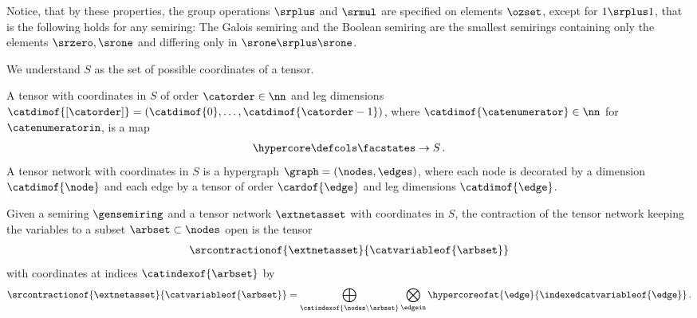 Notice, that by these properties, the group operations $\srplus$ and $\srmul$ are specified on elements $\ozset$, except for $1\srplus 1$, that is the following holds for any semiring:
The Galois semiring and the Boolean semiring are the smallest semirings containing only the elements $\srzero,\srone$ and differing only in $\srone\srplus\srone$.


We understand $S$ as the set of possible coordinates of a tensor.

\begin{definition}
    A tensor with coordinates in $S$ of order $\catorder\in\nn$ and leg dimensions $\catdimof{[\catorder]}=(\catdimof{0},\ldots,\catdimof{\catorder-1})$, where $\catdimof{\catenumerator}\in\nn$ for $\catenumeratorin$, is a map
    \begin{align*}
        \hypercore \defcols \facstates \rightarrow S \, .
    \end{align*}
    A tensor network with coordinates in $S$ is a hypergraph $\graph=(\nodes,\edges)$, where each node is decorated by a dimension $\catdimof{\node}$ and each edge by a tensor of order $\cardof{\edge}$ and leg dimensions $\catdimof{\edge}$.
\end{definition}



\begin{definition}
    Given a semiring $\gensemiring$ and a tensor network $\extnetasset$ with coordinates in $S$, the contraction of the tensor network keeping the variables to a subset $\arbset\subset\nodes$ open is the tensor
    \begin{align*}
        \srcontractionof{
            \extnetasset
        }{\catvariableof{\arbset}}
    \end{align*}
    with coordinates at indices $\catindexof{\arbset}$ by
    \begin{align*}
        \srcontractionof{
            \extnetasset
        }{\catvariableof{\arbset}}
        = \bigoplus_{\catindexof{\nodes\backslash\arbset}} \bigotimes_{\edgein} \hypercoreofat{\edge}{\indexedcatvariableof{\edge}} \, .
    \end{align*}
\end{definition}

